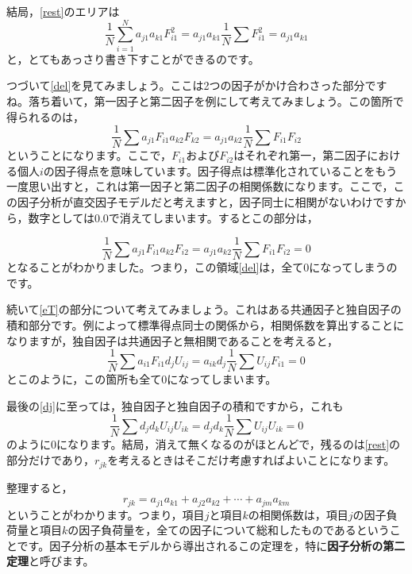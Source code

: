 \documentclass{ltjsbook}
\begin{document}
結局，\ref{rest}のエリアは
\begin{equation}
\frac{1}{N}\sum_{i=1}^{N}a_{j1}a_{k1}F_{i1}^2=a_{j1}a_{k1}\frac{1}{N}\sum F_{i1}^2=a_{j1}a_{k1}
\end{equation}
と，とてもあっさり書き下すことができるのです。

つづいて\ref{del}を見てみましょう。ここは2つの因子がかけ合わさった部分ですね。落ち着いて，第一因子と第二因子を例にして考えてみましょう。この箇所で得られるのは，
\begin{equation}
\frac{1}{N}\sum a_{j1}F_{i1} a_{k2}F_{k2} = a_{j1}a_{k2}\frac{1}{N}\sum F_{i1}F_{i2}
\end{equation}
ということになります。ここで，$F_{i1}$および$F_{i2}$はそれぞれ第一，第二因子における個人$i$の因子得点を意味しています。因子得点は標準化されていることをもう一度思い出すと，これは第一因子と第二因子の相関係数になります。ここで，この因子分析が直交因子モデルだと考えますと，因子同士に相関がないわけですから，数字としては$0.0$で消えてしまいます。するとこの部分は，

\begin{equation}
\frac{1}{N}\sum a_{j1}F_{i1} a_{k2}F_{i2} = a_{j1}a_{k2}\frac{1}{N}\sum F_{i1}F_{i2}=0
\end{equation}
となることがわかりました。つまり，この領域\ref{del}は，全て$0$になってしまうのです。


続いて\ref{eT}の部分について考えてみましょう。これはある共通因子と独自因子の積和部分です。例によって標準得点同士の関係から，相関係数を算出することになりますが，独自因子は共通因子と無相関であることを考えると，
\begin{equation}
\frac{1}{N}\sum a_{i1}F_{i1}d_{j}U_{ij}=a_{ik}d_{j} \frac{1}{N}\sum U_{ij}F_{i1} =0
\end{equation}
とこのように，この箇所も全て$0$になってしまいます。

最後の\ref{dj}に至っては，独自因子と独自因子の積和ですから，これも
\begin{equation}
\frac{1}{N}\sum d_{j}d_{k}U_{ij}U_{ik}=d_{j}d_{k}\frac{1}{N}\sum U_{ij}U_{ik}=0
\end{equation}
のように$0$になります。結局，消えて無くなるのがほとんどで，残るのは\ref{rest}の部分だけであり，$r_{jk}$を考えるときはそこだけ考慮すればよいことになります。

整理すると，
\begin{equation}
r_{jk}=a_{j1}a_{k1}+a_{j2}a_{k2}+ \cdots +a_{jm}a_{km}
\end{equation}
ということがわかります。つまり，項目$j$と項目$k$の相関係数は，項目$j$の因子負荷量と項目$k$の因子負荷量を，全ての因子について総和したものであるということです。因子分析の基本モデルから導出されるこの定理を，特に\textbf{因子分析の第二定理}と呼びます。
\end{document}
